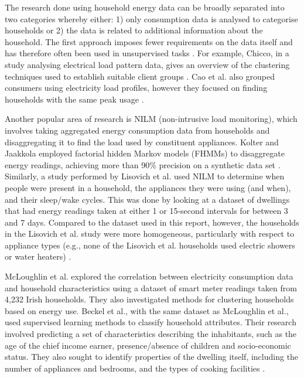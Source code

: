The research done using household energy data can be broadly separated into two categories whereby either: 1) only consumption data is analysed to categorise households or 2) the data is related to additional information about the household. The first approach imposes fewer requirements on the data itself and has therefore often been used in unsupervised tasks \cite{Beckel_3}. For example, Chicco, in a study analysing electrical load pattern data, gives an overview of the clustering techniques used to establish suitable client groups \cite{Chicco}. Cao et al. also grouped consumers using electricity load profiles, however they focused on finding households with the same peak usage \cite{Cao}. 

Another popular area of research is NILM (non-intrusive load monitoring), which involves taking aggregated energy consumption data from households and disaggregating it to find the load used by constituent appliances. Kolter and Jaakkola employed factorial hidden Markov models (FHMMs) to disaggregate energy readings, achieving more than 90\% precision on a synthetic data set \cite{Kolter}. Similarly, a study performed by Lisovich et al. used NILM to determine when people were present in a household, the appliances they were using (and when), and their sleep/wake cycles. This was done by looking at a dataset of dwellings that had energy readings taken at either 1 or 15-second intervals for between 3 and 7 days. Compared to the dataset used in this report, however, the households in the Lisovich et al. study were more homogeneous, particularly with respect to appliance types (e.g., none of the Lisovich et al. households used electric showers or water heaters) \cite{LMW}.

McLoughlin et al. explored the correlation between electricity consumption data and household characteristics using a dataset of smart meter readings taken from 4,232 Irish households. They also investigated methods for clustering households based on energy use. Beckel et al., with the same dataset as McLoughlin et al., used supervised learning methods to classify household attributes. Their research involved predicting a set of characteristics describing the inhabitants, such as the age of the chief income earner, presence/absence of children and socio-economic status. They also sought to identify properties of the dwelling itself, including the number of appliances and bedrooms, and the types of cooking facilities \cite{Beckel_3}. 

